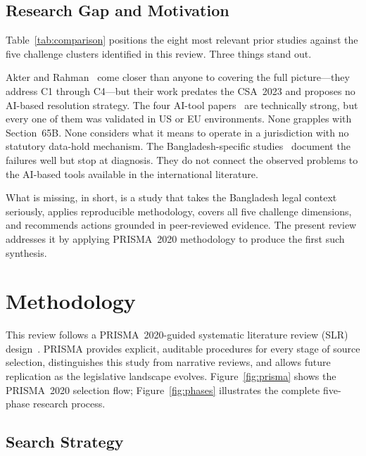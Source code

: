\documentclass[sigconf,nonacm]{acmart}
\begin{document}
\subsection{Research Gap and Motivation}

Table~\ref{tab:comparison} positions the eight most relevant prior
studies against the five challenge clusters identified in this review.
Three things stand out.

Akter and Rahman~\cite{akter2023} come closer than anyone to covering
the full picture---they address C1 through C4---but their work predates
the CSA~2023 and proposes no AI-based resolution strategy. The four
AI-tool papers~\cite{alharthi2025,igonor2025,tageldin2023,akilal2025}
are technically strong, but every one of them was validated in US or EU
environments. None grapples with Section~65B. None considers what it
means to operate in a jurisdiction with no statutory data-hold
mechanism. The Bangladesh-specific
studies~\cite{ali2023,uzzal2025,sharmin2025} document the failures well
but stop at diagnosis. They do not connect the observed problems to the
AI-based tools available in the international literature.

What is missing, in short, is a study that takes the Bangladesh legal
context seriously, applies reproducible methodology, covers all five
challenge dimensions, and recommends actions grounded in peer-reviewed
evidence. The present review addresses it by applying PRISMA~2020
methodology to produce the first such synthesis.

\section{Methodology}

This review follows a PRISMA~2020-guided systematic literature review
(SLR) design~\cite{page2021}. PRISMA provides explicit, auditable
procedures for every stage of source selection, distinguishes this study
from narrative reviews, and allows future replication as the legislative
landscape evolves. Figure~\ref{fig:prisma} shows the PRISMA~2020
selection flow; Figure~\ref{fig:phases} illustrates the complete
five-phase research process.

\subsection{Search Strategy}
\end{document}
